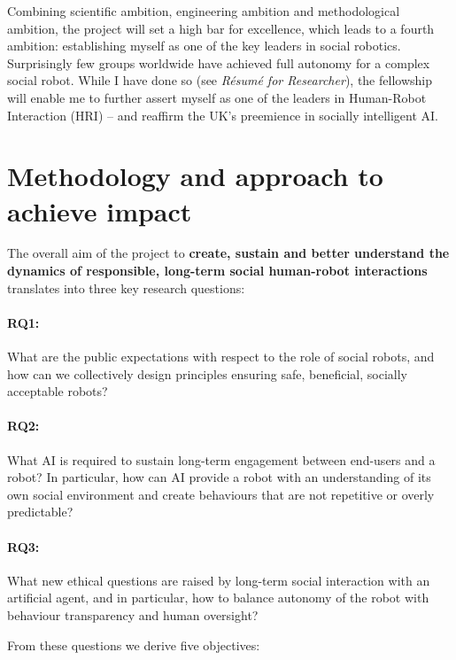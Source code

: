 Combining scientific ambition, engineering ambition and methodological ambition, the
\project project will set a high bar for excellence, which leads to a fourth
ambition: establishing myself as one of the key leaders in social robotics.
Surprisingly few groups worldwide have achieved full autonomy for a complex
social robot.  While I have done so (see \emph{Résumé for Researcher}), the
fellowship will enable me to further assert myself as one of the leaders in
Human-Robot Interaction (HRI) -- and reaffirm the UK's preemience in socially
intelligent AI.
 

\section{Methodology and approach to achieve impact}

The overall aim of the \project project to \textbf{create, sustain and better
understand the dynamics of responsible, long-term social human-robot
interactions} translates into three key research questions:

\paragraph{\bf RQ1:} What are the public expectations with respect to the role of social
        robots, and how can we collectively design principles ensuring safe, beneficial, socially
        acceptable robots?

\paragraph{\bf RQ2:} What AI is required to sustain long-term engagement between end-users
        and a robot? In particular, how can AI provide a robot with an understanding
        of its own social environment and create behaviours that are not
        repetitive or overly predictable?

\paragraph{\bf RQ3:} What new ethical questions are raised by long-term social interaction
        with an artificial agent, and in particular, how to balance autonomy of the
        robot with behaviour transparency and human oversight?

\vspace{0.5em}
\noindent From these questions we derive five objectives:

